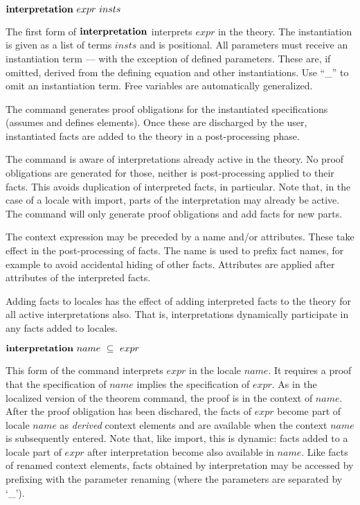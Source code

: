 \begin{descr}

\item [${\mathord{\mathbf{interpretation}}}~expr~insts$]

  The first form of ${\mathord{\mathbf{interpretation}}}$ interprets $expr$
  in the theory.  The instantiation is given as a list of
  terms $insts$ and is positional.
  All parameters must receive an instantiation term --- with the
  exception of defined parameters.  These are, if omitted, derived
  from the defining equation and other instantiations.  Use ``\_'' to
  omit an instantiation term.  Free variables are automatically
  generalized.

  The command generates proof obligations for the instantiated
  specifications (assumes and defines elements).  Once these are
  discharged by the user, instantiated facts are added to the theory in
  a post-processing phase.

  The command is aware of interpretations already active in the
  theory.  No proof obligations are generated for those, neither is
  post-processing applied to their facts.  This avoids duplication of
  interpreted facts, in particular.  Note that, in the case of a
  locale with import, parts of the interpretation may already be
  active.  The command will only generate proof obligations and add
  facts for new parts.

  The context expression may be preceded by a name and/or attributes.
  These take effect in the post-processing of facts.  The name is used
  to prefix fact names, for example to avoid accidental hiding of
  other facts.  Attributes are applied after attributes of the
  interpreted facts.

  Adding facts to locales has the
  effect of adding interpreted facts to the theory for all active
  interpretations also.  That is, interpretations dynamically
  participate in any facts added to locales.

\item [${\mathord{\mathbf{interpretation}}}~name~\subseteq~expr$]

  This form of the command interprets $expr$ in the locale $name$.  It
  requires a proof that the specification of $name$ implies the
  specification of $expr$.  As in the localized version of the theorem
  command, the proof is in the context of $name$.  After the proof
  obligation has been dischared, the facts of $expr$
  become part of locale $name$ as \emph{derived} context elements and
  are available when the context $name$ is subsequently entered.
  Note that, like import, this is dynamic: facts added to a locale
  part of $expr$ after interpretation become also available in
  $name$.  Like facts
  of renamed context elements, facts obtained by interpretation may be
  accessed by prefixing with the parameter renaming (where the parameters
  are separated by `\_').


\end{descr}

